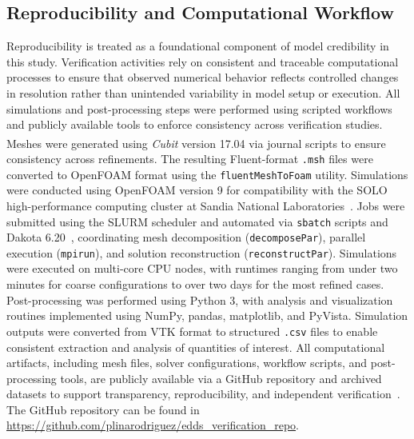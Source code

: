 \subsection{Reproducibility and Computational Workflow}
Reproducibility is treated as a foundational component of model credibility in this study. Verification activities rely on consistent and traceable computational processes to ensure that observed numerical behavior reflects controlled changes in resolution rather than unintended variability in model setup or execution.
All simulations and post-processing steps were performed using scripted workflows and publicly available tools to enforce consistency across verification studies. Meshes were generated using \textit{Cubit}\textsuperscript{\textregistered} version 17.04 via journal scripts to ensure consistency across refinements. The resulting Fluent-format \texttt{.msh} files were converted to OpenFOAM format using the \texttt{fluentMeshToFoam} utility. Simulations were conducted using OpenFOAM version 9 for compatibility with the SOLO high-performance computing cluster at Sandia National Laboratories~\cite{soloSNL}. Jobs were submitted using the SLURM scheduler and automated via \texttt{sbatch} scripts and Dakota 6.20~\cite{dakota}, coordinating mesh decomposition (\texttt{decomposePar}), parallel execution (\texttt{mpirun}), and solution reconstruction (\texttt{reconstructPar}). Simulations were executed on multi-core CPU nodes, with runtimes ranging from under two minutes for coarse configurations to over two days for the most refined cases. Post-processing was performed using Python 3, with analysis and visualization routines implemented using NumPy, pandas, matplotlib, and PyVista. Simulation outputs were converted from VTK format to structured \texttt{.csv} files to enable consistent extraction and analysis of quantities of interest. All computational artifacts, including mesh files, solver configurations, workflow scripts, and post-processing tools, are publicly available via a GitHub repository and archived datasets to support transparency, reproducibility, and independent verification~\cite{myRepo}. The GitHub repository can be found in \url{https://github.com/plinarodriguez/edds_verification_repo}.
